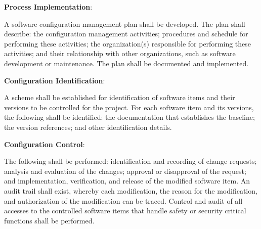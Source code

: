 			\begin{adjustwidth}{2em}{0pt} 

				\begin{compactenum}

					\item {\bf Process Implementation}:

					\begin{compactenum}

						\item A software configuration management plan shall be developed. The plan shall describe: the configuration management activities; procedures and schedule for performing these activities; the organization(s) responsible for performing these activities; and their relationship with other organizations, such as software development or maintenance. The plan shall be documented and implemented.

					\end{compactenum}

					\item {\bf Configuration Identification}:

					\begin{compactenum}

						\item A scheme shall be established for identification of software items and their versions to be controlled for the project. For each software item and its versions, the following shall be identified: the documentation that establishes the baseline; the version references; and other identification details.

					\end{compactenum}

					\item {\bf Configuration Control}:

					\begin{compactenum}

						\item The following shall be performed: identification and recording of change requests; analysis and evaluation of the changes; approval or disapproval of the request; and implementation, verification, and release of the modified software item. An audit trail shall exist, whereby each modification, the reason for the modification, and authorization of the modification can be traced. Control and audit of all accesses to the controlled software items that handle safety or security critical functions shall be performed.


\end{compactenum}
\end{compactenum}
\end{adjustwidth}

